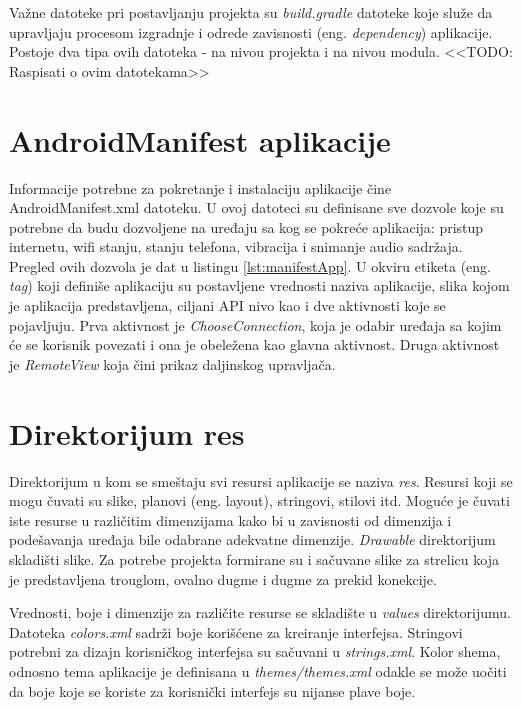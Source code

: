 \documentclass[implementacija.tex]{subfiles}
\begin{document}
Važne datoteke pri postavljanju projekta su \textit{build.gradle} datoteke koje služe da  upravljaju procesom izgradnje i odrede zavisnosti (eng. \textit{dependency}) aplikacije. Postoje dva tipa ovih datoteka - na nivou projekta i na nivou modula. <<TODO: Raspisati o ovim datotekama>>

\section{AndroidManifest aplikacije}

Informacije potrebne za pokretanje i instalaciju aplikacije čine AndroidManifest.xml datoteku. U ovoj datoteci su definisane sve dozvole koje su potrebne da budu dozvoljene na uređaju sa kog se pokreće aplikacija: pristup internetu, wifi stanju, stanju telefona, vibracija i  snimanje audio sadržaja. Pregled ovih dozvola je dat u listingu \ref{lst:manifestApp}. U okviru etiketa (eng. \textit{tag}) koji definiše aplikaciju su postavljene vrednosti naziva aplikacije, slika kojom je aplikacija predstavljena, ciljani API nivo kao i dve aktivnosti koje se pojavljuju. Prva aktivnost je \textit{ChooseConnection}, koja je odabir uređaja sa kojim će se korisnik povezati i ona je obeležena kao glavna aktivnost. Druga aktivnost je \textit{RemoteView} koja čini prikaz daljinskog upravljača. 




\section{Direktorijum res}
Direktorijum u kom se smeštaju svi resursi aplikacije se naziva \textit{res}. Resursi koji se mogu čuvati su slike, planovi (eng. layout), stringovi, stilovi itd. Moguće je čuvati iste resurse u različitim dimenzijama kako bi u zavisnosti od dimenzija i podešavanja uređaja bile odabrane adekvatne dimenzije. \textit{Drawable} direktorijum skladišti slike. Za potrebe projekta formirane su i sačuvane slike za strelicu koja je predstavljena trouglom, ovalno dugme i dugme za prekid konekcije. 

Vrednosti, boje i dimenzije za različite resurse se skladište u \textit{values} direktorijumu. Datoteka \textit{colors.xml} sadrži boje korišćene za kreiranje interfejsa. Stringovi potrebni za dizajn korisničkog interfejsa su sačuvani u \textit{strings.xml}. Kolor shema, odnosno tema aplikacije je definisana u \textit{themes/themes.xml} odakle se može uočiti da boje koje se koriste za korisnički interfejs su nijanse plave boje. 
\end{document}

